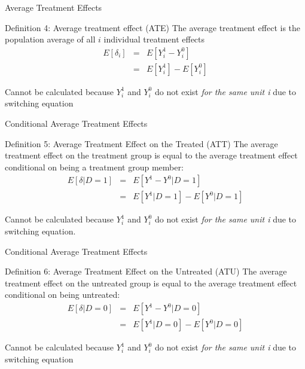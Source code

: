 \documentclass{beamer}
\begin{document}
\begin{frame}{Average Treatment Effects}

  \begin{block}{Definition 4: Average treatment effect (ATE)}
    The average treatment effect is the population average of all $i$ individual treatment effects
    \begin{eqnarray*}
      E[\delta_i]&=&E[Y_i^1-Y_i^0]\\
      &=&E[Y^1_i] - E[Y^0_i]
    \end{eqnarray*}
  \end{block}

  \bigskip

  Cannot be calculated because $Y^1_i$ and $Y^0_i$ do not exist \emph{for the same unit i} due to switching equation



\end{frame}



\begin{frame}{Conditional Average Treatment Effects}


  \begin{block}{Definition 5: Average Treatment Effect on the Treated (ATT)}
    The average treatment effect on the treatment group is equal to the average treatment effect conditional on being a treatment group member:
    \begin{eqnarray*}
      E[\delta|D=1]&=&E[Y^1-Y^0|D=1] \nonumber \\
      &=&E[Y^1|D=1]-E[Y^0|D=1]
    \end{eqnarray*}
  \end{block}
  Cannot be calculated because $Y^1_i$ and $Y^0_i$ do not exist \emph{for the same unit i} due to switching equation. 


\end{frame}



\begin{frame}{Conditional Average Treatment Effects}

  \begin{block}{Definition 6: Average Treatment Effect on the Untreated (ATU)}
    The average treatment effect on the untreated group is equal to the average treatment effect conditional on being untreated:
    \begin{eqnarray*}
      E[\delta|D=0]&=&E[Y^1-Y^0|D=0] \nonumber \\
      &=&E[Y^1|D=0]-E[Y^0|D=0]
    \end{eqnarray*}
  \end{block}
  Cannot be calculated because $Y^1_i$ and $Y^0_i$ do not exist \emph{for the same unit i} due to switching equation

\end{frame}
\end{document}
